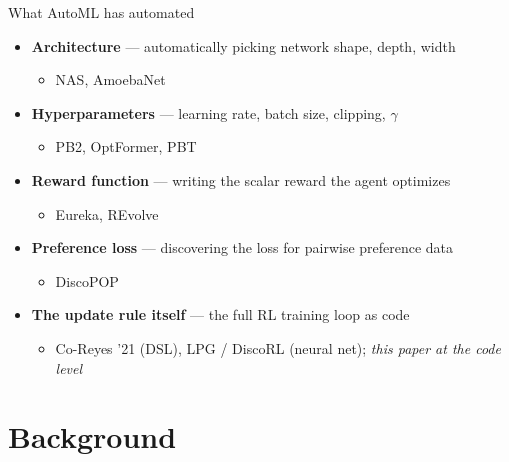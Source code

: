 \documentclass[10pt, aspectratio=169]{beamer}
\newcommand{\hilite}[1]{{\color{UofSCGarnet}\textbf{#1}}}
\begin{document}
\begin{frame}{What AutoML has automated}
  \vspace{0.2em}
  \begin{itemize}\setlength\itemsep{0.25em}
    \item \textbf{Architecture} --- automatically picking network shape, depth, width
      \begin{itemize}\setlength\itemsep{0pt}\item[] \small\color{UofSCGray70}NAS, AmoebaNet\end{itemize}
    \item \textbf{Hyperparameters} --- learning rate, batch size, clipping, $\gamma$
      \begin{itemize}\setlength\itemsep{0pt}\item[] \small\color{UofSCGray70}PB2, OptFormer, PBT\end{itemize}
    \item \textbf{Reward function} --- writing the scalar reward the agent optimizes
      \begin{itemize}\setlength\itemsep{0pt}\item[] \small\color{UofSCGray70}Eureka, REvolve\end{itemize}
    \item \textbf{Preference loss} --- discovering the loss for pairwise preference data
      \begin{itemize}\setlength\itemsep{0pt}\item[] \small\color{UofSCGray70}DiscoPOP\end{itemize}
    \item \hilite{The update rule itself} --- the full RL training loop as code
      \begin{itemize}\setlength\itemsep{0pt}\item[] \small\color{UofSCGray70}Co-Reyes '21 (DSL), LPG / DiscoRL (neural net); \textit{this paper at the code level}\end{itemize}
  \end{itemize}
\end{frame}

\section*{Background}

\end{document}
